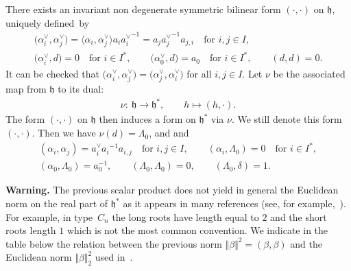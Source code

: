 \documentclass[pdftex]{sigma}
\numberwithin{equation}{section}
\newcommand{\al}{\alpha}
\newcommand{\La}{\Lambda}
\newcommand{\fh}{\mathfrak{h}}
\begin{document}
There exists an invariant non degenerate symmetric bilinear form $(\cdot,\cdot)$ on $\fh$, uniquely defined~by
\begin{gather*}
\bigl(\al_i^\vee,\al^\vee_j\bigr) = \bigl\langle\al_i,\al_j^\vee\bigr\rangle a_i{a_i^\vee}^{-1}=a_j{a_j^\vee}^{-1}a_{j,i}\quad\mbox{for $i,j\in I$},\\
\bigl(\al_i^\vee,d\bigr) = 0 \quad \mbox{for $i\in I^\ast$},\qquad
\bigl(\al_0^\vee,d\bigr) = a_0 \quad \mbox{for $i\in I^\ast$},\qquad
(d,d) = 0.
\end{gather*}
It can be checked that $\bigl(\al_i^\vee,\al_j^\vee\bigr) = \bigl(\al_j^\vee,\al_i^\vee\bigr)$ for all $i,j\in I$. Let $\nu$ be the associated map from $\fh$ to its dual:
\begin{align*}
\nu \colon \ \fh  \to  \fh^\ast,\qquad
 h \mapsto  (h,\cdot).
\end{align*}
The form $(\cdot,\cdot)$ on $\fh$ then induces a form on $\fh^\ast$ via $\nu$. We still denote this form $(\cdot,\cdot)$. Then we have $\nu(d) =\La_0$, \smash{$a_{i,j} = \frac{2(\al_i,\al_j)}{(\al_i,\al_i)}$} and \smash{$\nu\bigl(\al_i^{\vee}\bigr) = \frac{2\al_i}{(\al_i,\al_i)}$} and
\begin{gather*}
(\al_i,\al_j) = a_i^\vee{a_i}^{-1}a_{i,j}\quad\mbox{for $i,j\in I$},\qquad
(\al_i,\La_0) = 0 \quad \mbox{for $i\in I^\ast$},\\
(\al_0,\La_0) = a_0^{-1} ,\qquad
(\La_0,\La_0) = 0,\qquad
(\La_0,\delta)=1.
\end{gather*}

\textbf{Warning.} The previous scalar product does not yield in
general the Euclidean norm on the real part of $\fh^{\ast}$ as it appears in
many references (see, for example,~\cite{Bourbaki}). For example, in type~$C_{n}$
the long roots have length equal to $2$ and the short roots length $1$ which
is not the most common convention. We indicate in the table below the relation
between the previous norm $ \Vert \beta \Vert ^{2}=(\beta,\beta)$ and
the Euclidean norm $ \Vert \beta \Vert _{2}^{2}$ used in~\cite{Bourbaki}.
\end{document}
